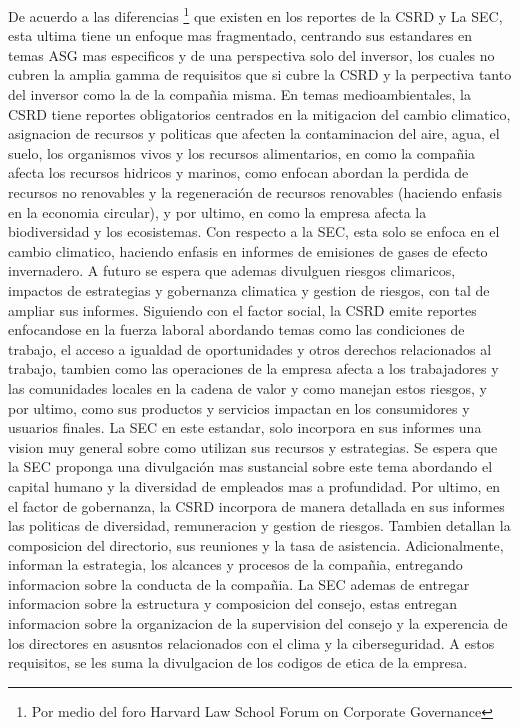 De acuerdo a las diferencias \footnote{Por medio del foro Harvard Law School Forum on Corporate Governance} que existen en los reportes de la CSRD y La SEC, esta ultima tiene un enfoque mas fragmentado, centrando sus estandares en temas ASG mas especificos y de una perspectiva solo del inversor, los cuales no cubren la amplia gamma de requisitos que si cubre la CSRD  y la perpectiva tanto del inversor como la de la compañia misma. En temas medioambientales, la CSRD tiene reportes obligatorios centrados en la mitigacion del cambio climatico, asignacion de recursos y politicas que afecten la contaminacion del aire, agua, el suelo, los organismos vivos y los recursos alimentarios, en como la compañia afecta los recursos hidricos y marinos, como enfocan abordan la perdida de recursos no renovables y la regeneración de recursos renovables (haciendo enfasis en la economia circular), y por ultimo, en como la empresa afecta la biodiversidad y los ecosistemas. Con respecto a la SEC, esta solo se enfoca en el cambio climatico, haciendo enfasis en informes de emisiones de gases de efecto invernadero. A futuro se espera que ademas divulguen riesgos climaricos, impactos de estrategias y gobernanza climatica y gestion de riesgos, con tal de ampliar sus informes. Siguiendo con el factor social, la CSRD emite reportes enfocandose en la fuerza laboral abordando temas como las condiciones de trabajo, el acceso a igualdad de oportunidades y otros derechos relacionados al trabajo, tambien como las operaciones de la empresa afecta  a los trabajadores y las comunidades locales en la cadena de valor y como manejan estos riesgos, y por ultimo, como sus productos y servicios impactan en los consumidores y usuarios finales. La SEC en este estandar, solo incorpora en sus informes una vision muy general sobre como utilizan sus recursos y estrategias. Se espera que la SEC proponga una divulgación mas sustancial sobre este tema abordando el capital humano y la diversidad de empleados mas a profundidad. Por ultimo, en el factor de gobernanza, la CSRD incorpora de manera detallada en sus informes las politicas de diversidad, remuneracion y gestion de riesgos. Tambien detallan la composicion del directorio, sus reuniones y la tasa de asistencia. Adicionalmente, informan la estrategia, los alcances y procesos de la compañia, entregando informacion sobre la conducta de la compañia. La SEC ademas de entregar informacion sobre la estructura y composicion del consejo, estas entregan informacion sobre la organizacion de la supervision del consejo y la experencia de los directores en asusntos relacionados con el clima y la ciberseguridad. A estos requisitos, se les suma la divulgacion de los codigos de etica de la empresa.

